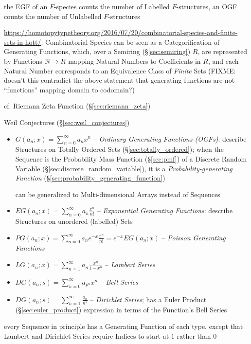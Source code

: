 the EGF of an $F$-species counts the number of Labelled $F$-structures, an OGF
counts the number of Unlabelled $F$-structures

\url{https://homotopytypetheory.org/2016/07/20/combinatorial-species-and-finite-sets-in-hott/}:
Combinatorial Species can be seen as a Categorification of Generating Functions,
which, over a Semiring (\S\ref{sec:semiring}) $R$, are represented by Functions
$\mathbb{N} \rightarrow R$ mapping Natural Numbers to Coefficients in $R$, and each
Natural Number corresponds to an Equivalence Class of \emph{Finite} Sets
(FIXME: doesn't this contradict the above statement that generating functions
are not ``functions'' mapping domain to codomain?)

\fist cf. Riemann Zeta Function (\S\ref{sec:riemann_zeta})

\fist Weil Conjectures (\S\ref{sec:weil_conjectures})

\begin{itemize}
  \item $G(a_n; x) = \sum_{n=0}^\infty a_n x^n$ -- \emph{Ordinary Generating
    Functions (OGFs)}: describe Structures on Totally Ordered Sets
    (\S\ref{sec:totally_ordered}); when the Sequence is the Probability Mass
    Function (\S\ref{sec:pmf}) of a Discrete Random Variable
    (\S\ref{sec:discrete_random_variable}), it is a \emph{Probability-generating
      Function} (\S\ref{sec:probability_generating_function})

    can be generalized to Multi-dimensional Arrays instead of Sequences
  \item $EG(a_n; x) = \sum_{n=0}^\infty a_n \frac{x^n}{n!}$ -- \emph{Exponential
    Generating Functions}: describe Structures on unordered (labelled) Sets
  \item $PG(a_n; x) = \sum_{n=0}^\infty a_n e^{-x}\frac{x^n}{n!} = e^{-x}EG(a_n; x)$
    -- \emph{Poisson Generating Functions}
  \item $LG(a_n; x) = \sum_{n=1}^\infty a_n \frac{x^n}{1 - x^n}$ --
    \emph{Lambert Series}
  \item $DG(a_n; s) = \sum_{n=0}^\infty a_{p^n} x^n$ -- \emph{Bell Series}
  \item $DG(a_n; s) = \sum_{n=1}^\infty \frac{a_n}{n^s}$ --
    \emph{Dirichlet Series}; has a Euler Product (\S\ref{sec:euler_product})
    expression in terms of the Function's Bell Series
\end{itemize}

every Sequence in principle has a Generating Function of each type, except that
Lambert and Dirichlet Series require Indices to start at $1$ rather than $0$



